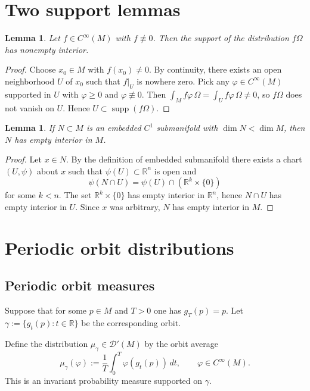 \documentclass[11pt]{article}
\newtheorem{lemma}[theorem]{Lemma}
\theoremstyle{definition}
\theoremstyle{remark}
\newcommand{\D}{\mathscr{D}}
\newcommand{\R}{\mathbb{R}}
\newcommand{\supp}{\operatorname{supp}}
\begin{document}
\section{Two support lemmas}

\begin{lemma}\label{lem:smoothsupport}
Let $f\in C^\infty(M)$ with $f\not\equiv 0$.
Then the support of the distribution $f\Omega$ has nonempty interior.
\end{lemma}

\begin{proof}
Choose $x_0\in M$ with $f(x_0)\neq 0$.
By continuity, there exists an open neighborhood $U$ of $x_0$ such that $f|_U$ is nowhere zero.
Pick any $\varphi\in C^\infty(M)$ supported in $U$ with $\varphi\ge 0$ and $\varphi\not\equiv 0$.
Then $\int_M f\varphi\,\Omega=\int_U f\varphi\,\Omega\neq 0$, so $f\Omega$ does not vanish on $U$.
Hence $U\subset\supp(f\Omega)$.
\end{proof}

\begin{lemma}\label{lem:submanifoldempty}
If $N\subset M$ is an embedded $C^1$ submanifold with $\dim N<\dim M$, then $N$ has empty interior in $M$.
\end{lemma}

\begin{proof}
Let $x\in N$.
By the definition of embedded submanifold there exists a chart $(U,\psi)$ about $x$ such that $\psi(U)\subset\R^n$ is open and
\[
\psi(N\cap U)=\psi(U)\cap (\R^k\times\{0\})
\]
for some $k<n$.
The set $\R^k\times\{0\}$ has empty interior in $\R^n$, hence $N\cap U$ has empty interior in $U$.
Since $x$ was arbitrary, $N$ has empty interior in $M$.
\end{proof}

\section{Periodic orbit distributions}

\subsection{Periodic orbit measures}

Suppose that for some $p\in M$ and $T>0$ one has $g_T(p)=p$.
Let $\gamma:=\{g_t(p):t\in\R\}$ be the corresponding orbit.

Define the distribution $\mu_\gamma\in\D'(M)$ by the orbit average
\begin{equation}\label{eq:orbitmeasure}
\mu_\gamma(\varphi):=\frac1T\int_0^T \varphi(g_t(p))\,dt,\qquad \varphi\in C^\infty(M).
\end{equation}
This is an invariant probability measure supported on $\gamma$.
\end{document}
